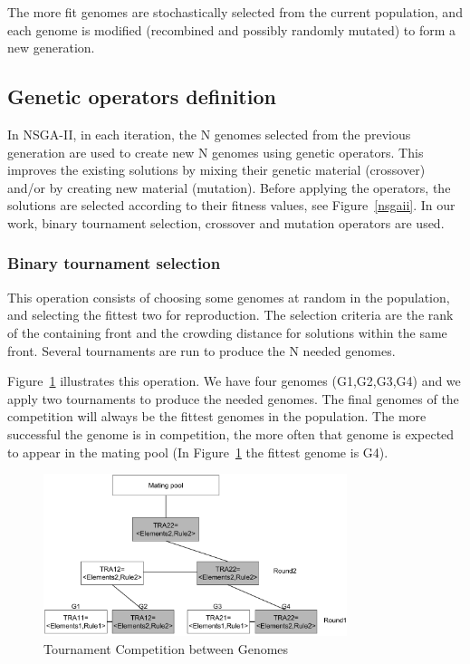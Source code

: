 \documentclass[conference]{IEEEtran}
\begin{document}
The more fit genomes are stochastically selected from the current population, and each genome is modified (recombined and possibly randomly mutated) to form a new generation.


\subsection{Genetic operators definition}
In NSGA-II, in each iteration, the N genomes selected from the previous generation are used to create new N genomes using genetic operators. This improves the existing solutions by mixing their genetic material (crossover) and/or by creating new material (mutation). Before applying the operators, the solutions are selected according to their fitness values, see Figure~\ref{nsgaii}. In our work, binary tournament selection, crossover and mutation operators are used.

\subsubsection{\textbf{Binary tournament selection}}
This operation consists of choosing some genomes at random in the population, and selecting the fittest two for reproduction. The selection criteria are the rank of the containing front and the crowding distance for solutions within the same front. Several tournaments are run to produce the N needed genomes.

Figure~\ref{binary} illustrates this operation. We have four genomes (G1,G2,G3,G4) and we apply two tournaments to produce the needed genomes. The final genomes of the competition will always be the fittest genomes in the population. The more successful the genome is in competition, the more often that genome is expected to appear in the mating pool (In Figure~\ref{binary} the fittest genome is G4).

\begin{figure}[!t]
\centering
\includegraphics[width=3.49in]{bt.pdf}
\caption{Tournament Competition between Genomes}
\label{binary}
\end{figure}
\end{document}
